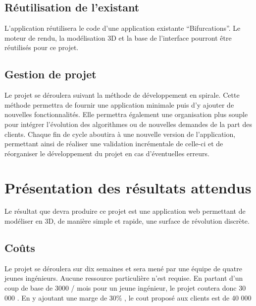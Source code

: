 \documentclass{scrartcl}
\begin{document}
	\subsection{Réutilisation de l'existant}
		L'application réutilisera le code d'une application existante ``Bifurcations''. Le moteur de rendu, la modélisation 3D et la base de l'interface pourront être réutilisés pour ce projet.


	\subsection{Gestion de projet}
		Le projet se déroulera suivant la méthode de développement en spirale. Cette méthode permettra de fournir une application minimale puis d'y ajouter de nouvelles fonctionnalités. Elle permettra également une organisation plus souple pour intégrer l'évolution des algorithmes ou de nouvelles demandes de la part des clients.
		Chaque fin de cycle aboutira à une nouvelle version de l'application, permettant ainsi de réaliser une validation incrémentale de celle-ci et de réorganiser le développement du projet en cas d'éventuelles erreurs.

\section{Présentation des résultats attendus}

	Le résultat que devra produire ce projet est une application web permettant de modéliser en 3D, de manière simple et rapide, une surface de révolution discrète.
	\subsection{Coûts}
		Le projet se déroulera sur dix  semaines et sera mené par une équipe de quatre jeunes ingénieurs. Aucune ressource particulière n'est requise. 
		En partant d'un coup de base de 3000 \Euro / mois pour un jeune ingénieur, le projet coutera donc 30 000 \Euro . En y ajoutant une marge de 30\% , le cout proposé aux clients est de 40 000\Euro
		
\end{document}
